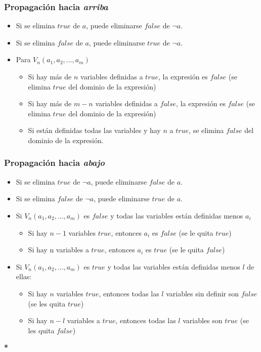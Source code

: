 \documentclass[11pt]{article}
\begin{document}
\subsubsection*{Propagación hacia \emph{arriba}}
\label{sec:org4a69321}
\begin{itemize}
\item Si se elimina \(true\) de \(a\), puede eliminarse \(false\) de \(\lnot a\).
\item Si se elimina \(false\) de  \(a\), puede eliminarse \(true\) de \(\lnot a\).
\item Para \(V_n(a_1,a_2,\ldots,a_m)\)
\begin{itemize}
\item Si hay más de \(n\) variables definidas a \(true\), la expresión es \(false\) (se elimina \(true\) del dominio de la expresión)
\item Si hay más de \(m-n\) variables definidas a \(false\), la expresión es \(false\) (se elimina \(true\) del dominio de la expresión)
\item Si están definidas todas las variables y hay \(n\) a \(true\), se elimina \(false\) del dominio de la expresión.
\end{itemize}
\end{itemize}


\subsubsection*{Propagación hacia \emph{abajo}}
\label{sec:orgbc3c64b}
\begin{itemize}
\item Si se elimina \(true\) de \(\lnot a\), puede eliminarse \(false\) de \(a\).
\item Si se elimina \(false\) de  \(\lnot a\), puede eliminarse \(true\) de \(a\).
\item Si \(V_n(a_1,a_2,\ldots,a_m)\) es \(false\) y todas las variables están definidas menos \(a_i\)
\begin{itemize}
\item Si hay \(n-1\) variables \(true\), entonces \(a_i\) es \(false\) (se le quita \(true\))
\item Si hay n variables a \(true\), entonces \(a_i\) es \(true\) (se le quita \(false\))
\end{itemize}
\item Si \(V_n(a_1,a_2,\ldots,a_m)\) es \(true\) y todas las variables están definidas menos \(l\) de ellas:
\begin{itemize}
\item Si hay \(n\) variables \(true\), entonces todas las \(l\) variables sin definir son \(false\) (se les quita \(true\))
\item Si hay \(n-l\) variables a \(true\), entonces todas las \(l\) variables son \(true\) (se les quita \(false\))
\end{itemize}
\end{itemize}


\textbf{*}
\end{document}
